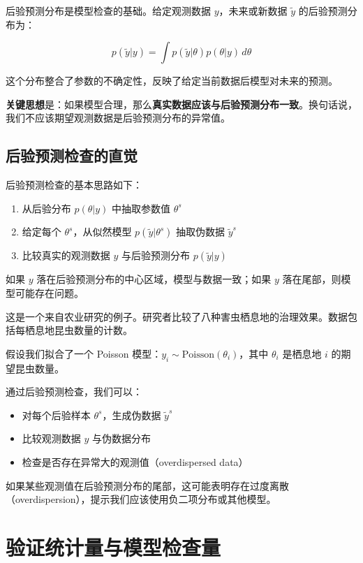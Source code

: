后验预测分布是模型检查的基础。给定观测数据 $y$，未来或新数据 $\tilde{y}$ 的后验预测分布为：

\[
p(\tilde{y} | y) = \int p(\tilde{y} | \theta) p(\theta | y) \, d\theta
\]

这个分布整合了参数的不确定性，反映了给定当前数据后模型对未来的预测。

\textbf{关键思想}是：如果模型合理，那么\textbf{真实数据应该与后验预测分布一致}。换句话说，我们不应该期望观测数据是后验预测分布的异常值。

\subsection{后验预测检查的直觉}

后验预测检查的基本思路如下：

\begin{enumerate}
  \item 从后验分布 $p(\theta | y)$ 中抽取参数值 $\theta^s$
  \item 给定每个 $\theta^s$，从似然模型 $p(\tilde{y} | \theta^s)$ 抽取伪数据 $\tilde{y}^s$
  \item 比较真实的观测数据 $y$ 与后验预测分布 $p(\tilde{y} | y)$
\end{enumerate}

如果 $y$ 落在后验预测分布的中心区域，模型与数据一致；如果 $y$ 落在尾部，则模型可能存在问题。

\begin{Example}[害虫治理研究]
  这是一个来自农业研究的例子。研究者比较了八种害虫栖息地的治理效果。数据包括每栖息地昆虫数量的计数。

  假设我们拟合了一个 Poisson 模型：$y_i \sim \mathrm{Poisson}(\theta_i)$，其中 $\theta_i$ 是栖息地 $i$ 的期望昆虫数量。

  通过后验预测检查，我们可以：
  \begin{itemize}
    \item 对每个后验样本 $\theta^s$，生成伪数据 $\tilde{y}^s$
    \item 比较观测数据 $y$ 与伪数据分布
    \item 检查是否存在异常大的观测值（overdispersed data）
  \end{itemize}

  如果某些观测值在后验预测分布的尾部，这可能表明存在过度离散（overdispersion），提示我们应该使用负二项分布或其他模型。
\end{Example}

\section{验证统计量与模型检查量}

